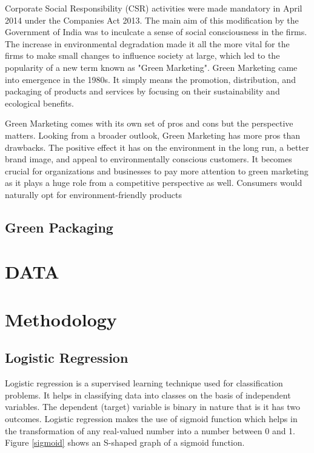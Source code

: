 \documentclass[a4paper,10pt]{article}
\begin{document}
Corporate Social Responsibility (CSR) activities were made mandatory in April 2014 under the Companies Act 2013. The main aim of this modification by the Government of India was to inculcate a sense of social consciousness in the firms. The increase in environmental degradation made it all the more vital for the firms to make small changes to influence society at large, which led to the popularity of a new term known as "Green Marketing". Green Marketing came into emergence in the 1980s. It simply means the promotion, distribution, and packaging of products and services by focusing on their sustainability and ecological benefits. 

Green Marketing comes with its own set of pros and cons but the perspective matters. Looking from a broader outlook, Green Marketing has more pros than drawbacks. The positive effect it has on the environment in the long run, a better brand image, and appeal to environmentally conscious customers. It becomes crucial for organizations and businesses to pay more attention to green marketing as it plays a huge role from a competitive perspective as well. Consumers would naturally opt for environment-friendly products \cite{Groening2018}


\subsection{Green Packaging}



\section{DATA}








\section{Methodology}

\subsection{Logistic Regression}

Logistic regression is a supervised learning technique used for classification problems. It helps in classifying data into classes on the basis of independent variables. The dependent (target) variable is binary in nature that is it has two outcomes. 
Logistic regression makes the use of sigmoid function which helps in the transformation of any real-valued number into a number between 0 and 1. Figure \ref{sigmoid} shows an S-shaped graph of a sigmoid function. 
\end{document}
